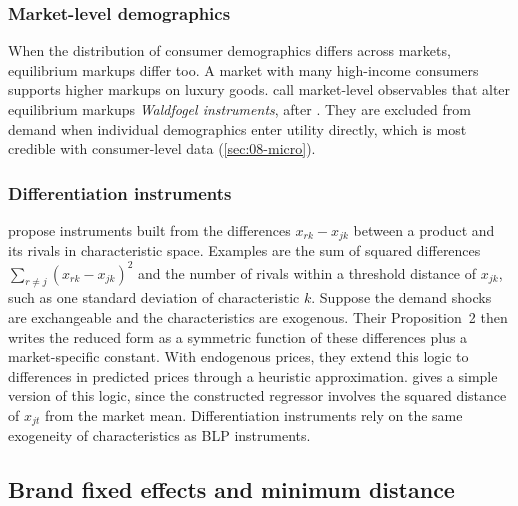 \subsubsection{Market-level demographics}
When the distribution of consumer demographics differs across markets, equilibrium markups differ too. A
market with many high-income consumers supports higher markups on luxury goods. \citet[Section 5.3]%
{BerryHaile2024} call market-level observables that alter equilibrium markups \emph{Waldfogel instruments},
after \citet{Waldfogel2003}. They are excluded from demand when individual demographics enter utility directly, which
is most credible with consumer-level data (\cref{sec:08-micro}).

\subsubsection{Differentiation instruments}
\citet[Section~2.3]{GandhiHoude2019} propose instruments built from the differences $x_{rk} - x_{jk}$ between a
product and its rivals in characteristic space. Examples are the sum of squared differences $\sum_{r \neq
j}(x_{rk} - x_{jk})^2$ and the number of rivals within a threshold distance of $x_{jk}$, such as one standard
deviation of characteristic $k$. Suppose the demand shocks are exchangeable and the characteristics are exogenous. Their
Proposition~2 then writes the reduced form as a symmetric function of these differences plus a market-specific
constant. With endogenous prices, they extend this logic to differences in predicted prices through a heuristic
approximation.  gives a simple version of this logic, since the
constructed regressor involves the squared distance of $x_{jt}$ from the market mean. Differentiation
instruments rely on the same exogeneity of characteristics as BLP instruments.

\subsection{Brand fixed effects and minimum distance}\label{sec:08-brand-fe}

